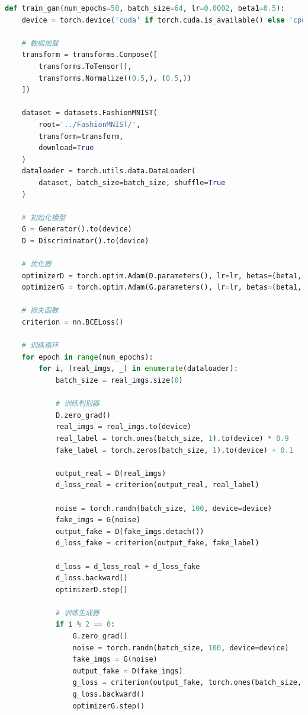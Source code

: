 \documentclass[UTF8]{ctexart}
\begin{document}
\begin{lstlisting}[language=Python, caption=GAN训练循环]
def train_gan(num_epochs=50, batch_size=64, lr=0.0002, beta1=0.5):
    device = torch.device('cuda' if torch.cuda.is_available() else 'cpu')
    
    # 数据加载
    transform = transforms.Compose([
        transforms.ToTensor(),
        transforms.Normalize((0.5,), (0.5,))
    ])
    
    dataset = datasets.FashionMNIST(
        root='../FashionMNIST/',
        transform=transform,
        download=True
    )
    dataloader = torch.utils.data.DataLoader(
        dataset, batch_size=batch_size, shuffle=True
    )
    
    # 初始化模型
    G = Generator().to(device)
    D = Discriminator().to(device)
    
    # 优化器
    optimizerD = torch.optim.Adam(D.parameters(), lr=lr, betas=(beta1, 0.999))
    optimizerG = torch.optim.Adam(G.parameters(), lr=lr, betas=(beta1, 0.999))
    
    # 损失函数
    criterion = nn.BCELoss()
    
    # 训练循环
    for epoch in range(num_epochs):
        for i, (real_imgs, _) in enumerate(dataloader):
            batch_size = real_imgs.size(0)
            
            # 训练判别器
            D.zero_grad()
            real_imgs = real_imgs.to(device)
            real_label = torch.ones(batch_size, 1).to(device) * 0.9
            fake_label = torch.zeros(batch_size, 1).to(device) + 0.1
            
            output_real = D(real_imgs)
            d_loss_real = criterion(output_real, real_label)
            
            noise = torch.randn(batch_size, 100, device=device)
            fake_imgs = G(noise)
            output_fake = D(fake_imgs.detach())
            d_loss_fake = criterion(output_fake, fake_label)
            
            d_loss = d_loss_real + d_loss_fake
            d_loss.backward()
            optimizerD.step()
            
            # 训练生成器
            if i % 2 == 0:
                G.zero_grad()
                noise = torch.randn(batch_size, 100, device=device)
                fake_imgs = G(noise)
                output_fake = D(fake_imgs)
                g_loss = criterion(output_fake, torch.ones(batch_size, 1).to(device))
                g_loss.backward()
                optimizerG.step()
\end{lstlisting}
\end{document}
